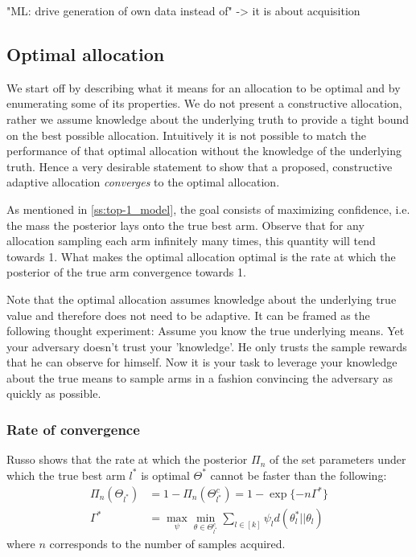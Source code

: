 "ML: drive generation of own data instead of" -> it is about acquisition

\subsection{Optimal allocation}\label{subsection:optimal_allocation}

We start off by describing what it means for an allocation to be optimal and by enumerating some of its properties. We do not present a constructive allocation, rather we assume knowledge about the underlying truth to provide a tight bound on the best possible allocation. Intuitively it is not possible to match the performance of that optimal allocation without the knowledge of the underlying truth. Hence a very desirable statement to show that a proposed, constructive adaptive allocation \emph{converges} to the optimal allocation.

As mentioned in \ref{ss:top-1_model}, the goal consists of maximizing confidence, i.e. the mass the posterior lays onto the true best arm. Observe that for any allocation sampling each arm infinitely many times, this quantity will tend towards 1. What makes the optimal allocation optimal is the rate at which the posterior of the true arm convergence towards 1.

Note that the optimal allocation assumes knowledge about the underlying true value and therefore does not need to be adaptive. It can be framed as the following thought experiment: Assume you know the true underlying means. Yet your adversary doesn't trust your 'knowledge'. He only trusts the sample rewards that he can observe for himself. Now it is your task to leverage your knowledge about the true means to sample arms in a fashion convincing the adversary as quickly as possible.

\subsubsection{Rate of convergence}
Russo \cite{DBLP:journals/corr/Russo16} shows that the rate at which the posterior $\Pi_n$ of the set parameters under which the true best arm $l^*$ is optimal $\Theta^*$ cannot be faster than the following:
\begin{align}
  \Pi_n(\Theta_{l^*}) &= 1 - \Pi_n(\Theta^c_{l^*}) = 1 - \exp\{-n\Gamma^*\} \\
  \Gamma^* &= \max_{\psi} \min_{\theta \in \Theta^c_{l^*}} \sum_{l \in [k]} \psi_l d(\theta_l^* || \theta_l)
\end{align}
where $n$ corresponds to the number of samples acquired.

